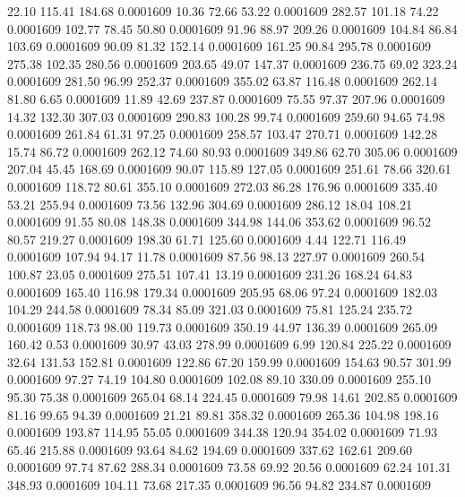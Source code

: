   22.10  115.41  184.68   0.0001609
  10.36   72.66   53.22   0.0001609
 282.57  101.18   74.22   0.0001609
 102.77   78.45   50.80   0.0001609
  91.96   88.97  209.26   0.0001609
 104.84   86.84  103.69   0.0001609
  90.09   81.32  152.14   0.0001609
 161.25   90.84  295.78   0.0001609
 275.38  102.35  280.56   0.0001609
 203.65   49.07  147.37   0.0001609
 236.75   69.02  323.24   0.0001609
 281.50   96.99  252.37   0.0001609
 355.02   63.87  116.48   0.0001609
 262.14   81.80    6.65   0.0001609
  11.89   42.69  237.87   0.0001609
  75.55   97.37  207.96   0.0001609
  14.32  132.30  307.03   0.0001609
 290.83  100.28   99.74   0.0001609
 259.60   94.65   74.98   0.0001609
 261.84   61.31   97.25   0.0001609
 258.57  103.47  270.71   0.0001609
 142.28   15.74   86.72   0.0001609
 262.12   74.60   80.93   0.0001609
 349.86   62.70  305.06   0.0001609
 207.04   45.45  168.69   0.0001609
  90.07  115.89  127.05   0.0001609
 251.61   78.66  320.61   0.0001609
 118.72   80.61  355.10   0.0001609
 272.03   86.28  176.96   0.0001609
 335.40   53.21  255.94   0.0001609
  73.56  132.96  304.69   0.0001609
 286.12   18.04  108.21   0.0001609
  91.55   80.08  148.38   0.0001609
 344.98  144.06  353.62   0.0001609
  96.52   80.57  219.27   0.0001609
 198.30   61.71  125.60   0.0001609
   4.44  122.71  116.49   0.0001609
 107.94   94.17   11.78   0.0001609
  87.56   98.13  227.97   0.0001609
 260.54  100.87   23.05   0.0001609
 275.51  107.41   13.19   0.0001609
 231.26  168.24   64.83   0.0001609
 165.40  116.98  179.34   0.0001609
 205.95   68.06   97.24   0.0001609
 182.03  104.29  244.58   0.0001609
  78.34   85.09  321.03   0.0001609
  75.81  125.24  235.72   0.0001609
 118.73   98.00  119.73   0.0001609
 350.19   44.97  136.39   0.0001609
 265.09  160.42    0.53   0.0001609
  30.97   43.03  278.99   0.0001609
   6.99  120.84  225.22   0.0001609
  32.64  131.53  152.81   0.0001609
 122.86   67.20  159.99   0.0001609
 154.63   90.57  301.99   0.0001609
  97.27   74.19  104.80   0.0001609
 102.08   89.10  330.09   0.0001609
 255.10   95.30   75.38   0.0001609
 265.04   68.14  224.45   0.0001609
  79.98   14.61  202.85   0.0001609
  81.16   99.65   94.39   0.0001609
  21.21   89.81  358.32   0.0001609
 265.36  104.98  198.16   0.0001609
 193.87  114.95   55.05   0.0001609
 344.38  120.94  354.02   0.0001609
  71.93   65.46  215.88   0.0001609
  93.64   84.62  194.69   0.0001609
 337.62  162.61  209.60   0.0001609
  97.74   87.62  288.34   0.0001609
  73.58   69.92   20.56   0.0001609
  62.24  101.31  348.93   0.0001609
 104.11   73.68  217.35   0.0001609
  96.56   94.82  234.87   0.0001609
